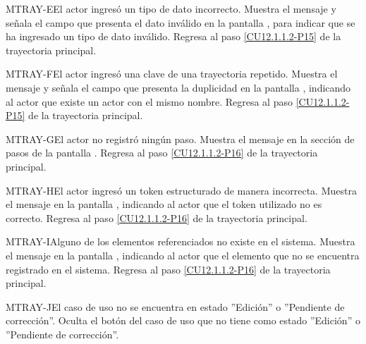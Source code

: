 	\begin{UCtrayectoriaA}{MTRAY-E}{El actor ingresó un tipo de dato incorrecto.}
		\UCpaso[\UCsist] Muestra el mensaje  y señala el campo que presenta el dato inválido en la pantalla , para indicar que se ha ingresado un tipo de dato inválido.
		\UCpaso Regresa al paso \ref{CU12.1.1.2-P15} de la trayectoria principal.
	\end{UCtrayectoriaA}
	
	\begin{UCtrayectoriaA}{MTRAY-F}{El actor ingresó una clave de una trayectoria repetido.}
		\UCpaso[\UCsist] Muestra el mensaje  y señala el campo que presenta la duplicidad en la pantalla , indicando al actor que existe un actor con el mismo nombre.
		\UCpaso Regresa al paso \ref{CU12.1.1.2-P15} de la trayectoria principal.
	\end{UCtrayectoriaA}

	\begin{UCtrayectoriaA}{MTRAY-G}{El actor no registró ningún paso.}
		\UCpaso[\UCsist] Muestra el mensaje  en la sección de pasos de la pantalla .
		\UCpaso Regresa al paso \ref{CU12.1.1.2-P16} de la trayectoria principal.
	\end{UCtrayectoriaA}

	\begin{UCtrayectoriaA}{MTRAY-H}{El actor ingresó un token estructurado de manera incorrecta.}
		\UCpaso[\UCsist] Muestra el mensaje  en la pantalla , indicando al actor que el token utilizado no es correcto.
		\UCpaso Regresa al paso \ref{CU12.1.1.2-P16} de la trayectoria principal.
	\end{UCtrayectoriaA}
	
	\begin{UCtrayectoriaA}{MTRAY-I}{Alguno de los elementos referenciados no existe en el sistema.}
		\UCpaso[\UCsist] Muestra el mensaje  en la pantalla , indicando al actor que el elemento que no se encuentra registrado en el sistema.
		\UCpaso Regresa al paso \ref{CU12.1.1.2-P16} de la trayectoria principal.
	\end{UCtrayectoriaA}

	\begin{UCtrayectoriaA}{MTRAY-J}{El caso de uso no se encuentra en estado ''Edición'' o ''Pendiente de corrección''.}
		\UCpaso[\UCsist] Oculta el botón  del caso de uso que no tiene como estado ''Edición'' o ''Pendiente de corrección''.
	\end{UCtrayectoriaA}


